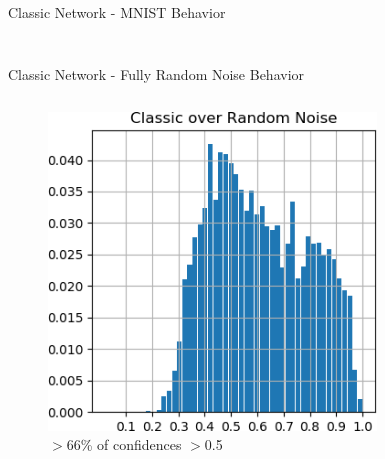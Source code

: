 \documentclass{beamer}
\begin{document}
\begin{frame}{Classic Network - MNIST Behavior}
\begin{columns}
\begin{column}{.5\textwidth}
\begin{figure}
        \caption*{}
    \end{figure}
    \end{column}
    \end{columns}
    
    
\end{frame}

\begin{frame}{Classic Network - Fully Random Noise Behavior}

    \begin{columns}
    \begin{column}{.5\textwidth}
    \begin{figure}
        \centering
        \includegraphics[width=.85\textwidth]{images/mnist-behavior/classic-hist-random.png}
        \caption*{ $>$66\% of confidences $>$0.5}
    \end{figure}
    \end{column}
    \begin{column}{.5\textwidth}
    \begin{figure}
        \raggedright
        \vspace{-3mm}

\end{figure}
\end{column}
\end{columns}
\end{frame}
\end{document}
